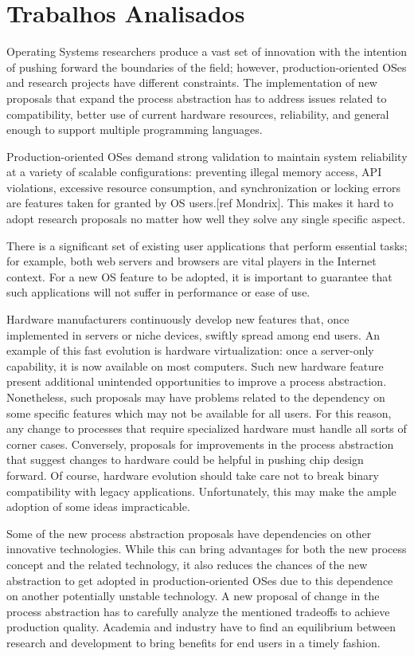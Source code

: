 \chapter{Trabalhos Analisados}
\label{cap:trabalhos-analisados}

Operating Systems researchers produce a vast set of innovation with the
intention of pushing forward the boundaries of the field; however,
production-oriented OSes and research projects have different constraints. The
implementation of new proposals that expand the process abstraction has to
address issues related to compatibility, better use of current hardware
resources, reliability, and general enough to support multiple programming
languages.

Production-oriented OSes demand strong validation to maintain system
reliability at a variety of scalable configurations: preventing illegal memory
access, API violations, excessive resource consumption, and synchronization or
locking errors are features taken for granted by OS users.[ref Mondrix]. This
makes it hard to adopt research proposals no matter how well they solve any
single specific aspect.

There is a significant set of existing user applications that perform essential
tasks; for example, both web servers and browsers are vital players in the
Internet context. For a new OS feature to be adopted, it is important to
guarantee that such applications will not suffer in performance or ease of use.

Hardware manufacturers continuously develop new features that, once implemented
in servers or niche devices, swiftly spread among end users. An example of this
fast evolution is hardware virtualization: once a server-only capability, it is
now available on most computers. Such new hardware feature present additional
unintended opportunities to improve a process abstraction. Nonetheless, such
proposals may have problems related to the dependency on some specific features
which may not be available for all users. For this reason, any change to
processes that require specialized hardware must handle all sorts of corner
cases. Conversely, proposals for improvements in the process abstraction that
suggest changes to hardware could be helpful in pushing chip design forward. Of
course, hardware evolution should take care not to break binary compatibility
with legacy applications. Unfortunately, this may make the ample adoption of
some ideas impracticable.

Some of the new process abstraction proposals have dependencies on other
innovative technologies. While this can bring advantages for both the new
process concept and the related technology, it also reduces the chances of the
new abstraction to get adopted in production-oriented OSes due to this
dependence on another potentially unstable technology.  A new proposal of
change in the process abstraction has to carefully analyze the mentioned
tradeoffs to achieve production quality. Academia and industry have to find an
equilibrium between research and development to bring benefits for end users in
a timely fashion.

